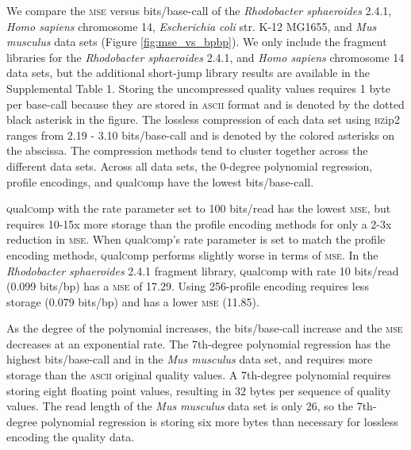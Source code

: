 \documentclass{bioinfo}
\begin{document}
We compare the \textsc{mse} versus bits/base-call of the
\textit{Rhodobacter sphaeroides} 2.4.1, \textit{Homo sapiens}
chromosome 14, \textit{Escherichia coli} str. K-12 MG1655, and
\textit{Mus musculus} data sets (Figure \ref{fig:mse_vs_bpbp}). We
only include the fragment libraries for the \textit{Rhodobacter
  sphaeroides} 2.4.1, and \textit{Homo sapiens} chromosome 14 data
sets, but the additional short-jump library results are available in
the Supplemental Table 1. Storing the uncompressed quality values
requires 1 byte per base-call because they are stored in
\textsc{ascii} format and is denoted by the dotted black asterisk in
the figure. The lossless compression of each data set using
\textsc{bz}ip2 ranges from 2.19 - 3.10 bits/base-call and is denoted
by the colored asterisks on the abscissa. The compression methods tend
to cluster together across the different data sets. Across all data
sets, the 0-degree polynomial regression, profile encodings, and
\textsc{q}ual\textsc{c}omp have the lowest bits/base-call.

\textsc{q}ual\textsc{c}omp with the rate parameter set to 100
bits/read has the lowest \textsc{mse}, but requires 10-15x more
storage than the profile encoding methods for only a 2-3x reduction in
\textsc{mse}. When \textsc{q}ual\textsc{c}omp's rate parameter is set
to match the profile encoding methods, \textsc{q}ual\textsc{c}omp
performs slightly worse in terms of \textsc{mse}. In the
\textit{Rhodobacter sphaeroides} 2.4.1 fragment library,
\textsc{q}ual\textsc{c}omp with rate 10 bits/read (0.099 bits/bp) has
a \textsc{mse} of 17.29. Using 256-profile encoding requires less
storage (0.079 bits/bp) and has a lower \textsc{mse} (11.85).

As the degree of the polynomial increases, the bits/base-call increase
and the \textsc{mse} decreases at an exponential rate. The 7th-degree
polynomial regression has the highest bits/base-call and in the
\textit{Mus musculus} data set, and requires more storage than the
\textsc{ascii} original quality values. A 7th-degree polynomial
requires storing eight floating point values, resulting in 32 bytes
per sequence of quality values. The read length of the \textit{Mus
  musculus} data set is only 26, so the 7th-degree polynomial
regression is storing six more bytes than necessary for lossless
encoding the quality data.
\end{document}
